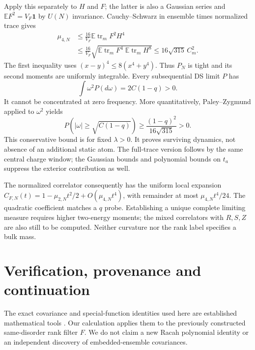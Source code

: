 \documentclass[11pt,a4paper]{article}
\newcommand{\tr}{\operatorname{tr}}
\newcommand{\E}{\mathbb E}
\begin{document}
Apply this separately to $H$ and $F$; the latter is also a
Gaussian series and $\E F^2=V_F\mathbf1$ by $U(N)$ invariance.
Cauchy--Schwarz in ensemble times normalized trace gives
\begin{align}
 \mu_{4,N}
 &\leq \frac{16}{V_F}\E\tr_m F^2H^4\\
 &\leq\frac{16}{V_F}
 \sqrt{\E\tr_m F^4\;\E\tr_m H^8}
 \leq16\sqrt{315}\,C_m^2.                    \label{tail}
\end{align}
The first inequality uses $(x-y)^4\leq8(x^4+y^4)$.
Thus $P_N$ is tight and its second moments are uniformly
integrable. Every subsequential DS limit $P$ has
\[
 \int\omega^2P(d\omega)=2C(1-q)>0.
\]
It cannot be concentrated at zero frequency. More quantitatively,
Paley--Zygmund applied to $\omega^2$ yields
\begin{equation}
 P\!\left(|\omega|\geq\sqrt{C(1-q)}\right)
 \geq\frac{(1-q)^2}{16\sqrt{315}}>0.           \label{weightbound}
\end{equation}
This conservative bound is for fixed $\lambda>0$. It proves
surviving dynamics, not absence of an additional static atom.
The full-trace version follows by the same central charge window;
the Gaussian bounds and polynomial bounds on $t_a$ suppress
the exterior contribution as well.

The normalized correlator consequently has the uniform local
expansion $C_{F,N}(t)=1-\mu_{2,N}t^2/2+O(\mu_{4,N}t^4)$,
with remainder at most $\mu_{4,N}t^4/24$.
The quadratic coefficient matches a $q$ probe. Establishing a
unique complete limiting measure requires higher two-energy
moments; the mixed correlators with $R,S,Z$ are also still to be
computed. Neither curvature nor the rank label specifies a bulk mass.

\newpage
\section{Verification, provenance and continuation}
The exact covariance and special-function identities used here
are established mathematical tools \cite{kota,tall,sums,racah}.
Our calculation applies them to the previously constructed
same-disorder rank filter $F$. We do not claim a new Racah
polynomial identity or an independent discovery of embedded-ensemble
covariances.
\end{document}
